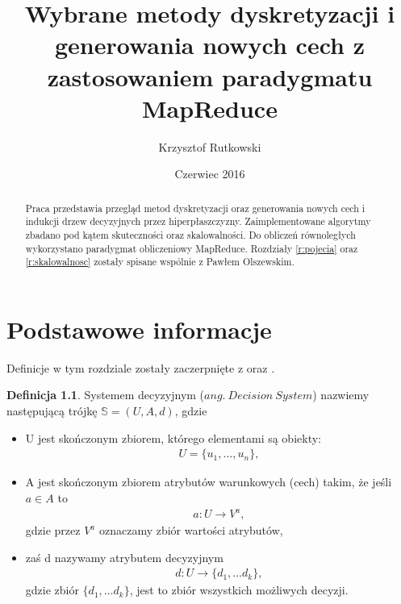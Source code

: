 \documentclass[magisterska]{pracamgr}
\author{Krzysztof Rutkowski}
\title{Wybrane metody dyskretyzacji i generowania nowych cech z zastosowaniem paradygmatu MapReduce}
\date{Czerwiec 2016}
\theoremstyle{plain}
\theoremstyle{definition}
\newtheorem{definicja}[thm]{Definicja}
\theoremstyle{remark}
\begin{document}
\maketitle

\begin{abstract}
Praca przedstawia przegląd metod dyskretyzacji oraz generowania nowych cech i indukcji drzew decyzyjnych przez hiperpłaszczyzny. 
Zaimplementowane algorytmy zbadano pod kątem 
skuteczności oraz skalowalności. Do obliczeń równoległych wykorzystano paradygmat obliczeniowy MapReduce.
Rozdziały \ref{r:pojecia} oraz \ref{r:skalowalnosc} zostały spisane wspólnie z Pawłem Olszewskim.
\end{abstract}

\tableofcontents


\chapter{Podstawowe informacje}\label{r:pojecia}
Definicje w tym rozdziale zostały zaczerpnięte z \cite{Rudiments} oraz \cite{Discretization}.
\begin{definicja}
Systemem decyzyjnym ($ang. \ Decision \ System$) nazwiemy następującą
trójkę $\mathbb{S} = (U, A, d)$, gdzie
\begin{itemize}
 \item U jest skończonym zbiorem, którego elementami są obiekty:
    \begin{align*}
	    U = \{u_1, \ldots, u_n \},  
    \end{align*}

 \item A jest skończonym zbiorem atrybutów warunkowych (cech) takim, że jeśli $ a \in A$ to
    \begin{align*}
	  a:U \rightarrow V^{a},
    \end{align*}
    gdzie przez $V^{a}$ oznaczamy zbiór wartości atrybutów,
    
 \item zaś d nazywamy atrybutem decyzyjnym
    \begin{align*}
     d: U \rightarrow \{d_1, \ldots d_k\},
    \end{align*}
  gdzie zbiór $\{d_1, \ldots d_k\}$, jest to zbiór wszystkich możliwych decyzji.
\end{itemize}

\end{definicja}
\end{document}
